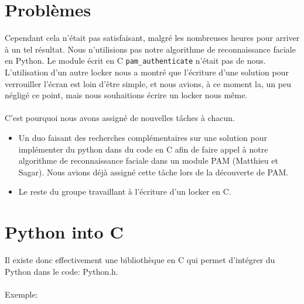 \documentclass{article}
\begin{document}
  \section{Problèmes}

  Cependant cela n’était pas satisfaisant, malgré les nombreuses heures pour
  arriver à un tel résultat. Nous n’utilisions pas notre algorithme de
  reconnaissance faciale en Python. Le module écrit en C
  \texttt{pam\_authenticate} n’était pas de nous. L’utilisation d’un autre
  locker nous a montré que l’écriture d’une solution pour verrouiller l’écran
  est loin d’être simple, et nous avions, à ce moment la, un peu négligé ce
  point, mais nous souhaitions écrire un locker nous même.
\\ \\
  C’est pourquoi nous avons assigné de nouvelles tâches à chacun.
  \begin{itemize}
    \item{Un duo faisant des recherches complémentaires sur une
  solution pour implémenter du python dans du code en C afin de faire appel à
  notre algorithme de reconnaissance faciale dans un module PAM (Matthieu et
  Sagar). Nous avions déjà assigné cette tâche lors de la découverte de PAM.}
    \item{Le reste du groupe travaillant à l’écriture d’un locker en C.}
  \end{itemize}

  \section{Python into C}

  Il existe donc effectivement une bibliothèque en C qui permet d’intégrer du
  Python dans le code: Python.h.
\\ \\
  Exemple:
\end{document}
